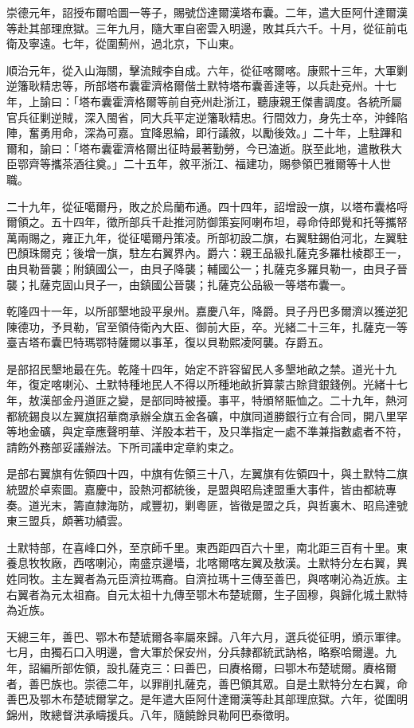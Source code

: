 \begin{pinyinscope}
崇德元年，詔授布爾哈圖一等子，賜號岱達爾漢塔布囊。二年，遣大臣阿什達爾漢等赴其部理庶獄。三年九月，隨大軍自密雲入明邊，敗其兵六千。十月，從征前屯衛及寧遠。七年，從圍薊州，過北京，下山東。

順治元年，從入山海關，擊流賊李自成。六年，從征喀爾喀。康熙十三年，大軍剿逆籓耿精忠等，所部塔布囊霍濟格爾偕土默特塔布囊善達等，以兵赴兗州。十七年，上諭曰：「塔布囊霍濟格爾等前自兗州赴浙江，聽康親王傑書調度。各統所屬官兵征剿逆賊，深入閩省，同大兵平定逆籓耿精忠。行間效力，身先士卒，沖鋒陷陣，奮勇用命，深為可嘉。宜降恩綸，即行議敘，以勵後效。」二十年，上駐蹕和爾和，諭曰：「塔布囊霍濟格爾出征時最著勤勞，今已溘逝。朕至此地，遣散秩大臣鄂齊等攜茶酒往奠。」二十五年，敘平浙江、福建功，賜參領巴雅爾等十人世職。

二十九年，從征噶爾丹，敗之於烏蘭布通。四十四年，詔增設一旗，以塔布囊格哷爾領之。五十四年，徵所部兵千赴推河防御策妄阿喇布坦，尋命侍郎覺和托等攜帑萬兩賜之，雍正九年，從征噶爾丹策凌。所部初設二旗，右翼駐錫伯河北，左翼駐巴顏珠爾克；後增一旗，駐左右翼界內。爵六：親王品級扎薩克多羅杜棱郡王一，由貝勒晉襲；附鎮國公一，由貝子降襲；輔國公一；扎薩克多羅貝勒一，由貝子晉襲；扎薩克固山貝子一，由鎮國公晉襲；扎薩克公品級一等塔布囊一。

乾隆四十一年，以所部墾地設平泉州。嘉慶八年，降爵。貝子丹巴多爾濟以獲逆犯陳德功，予貝勒，官至領侍衛內大臣、御前大臣，卒。光緒二十三年，扎薩克一等臺吉塔布囊巴特瑪鄂特薩爾以事革，復以貝勒熙凌阿襲。存爵五。

是部招民墾地最在先。乾隆十四年，始定不許容留民人多墾地畝之禁。道光十九年，復定喀喇沁、土默特種地民人不得以所種地畝折算蒙古賒貸銀錢例。光緒十七年，敖漢部金丹道匪之變，是部同時被擾。事平，特頒帑賑恤之。二十九年，熱河都統錫良以左翼旗招華商承辦全旗五金各礦，中旗同道勝銀行立有合同，開八里罕等地金礦，與定章應聲明華、洋股本若干，及只準指定一處不準兼指數處者不符，請飭外務部妥議辦法。下所司議申定章約束之。

是部右翼旗有佐領四十四，中旗有佐領三十八，左翼旗有佐領四十，與土默特二旗統盟於卓索圖。嘉慶中，設熱河都統後，是盟與昭烏達盟重大事件，皆由都統專奏。道光末，籌直隸海防，咸豐初，剿粵匪，皆徵是盟之兵，與哲裏木、昭烏達號東三盟兵，頗著功績雲。

土默特部，在喜峰口外，至京師千里。東西距四百六十里，南北距三百有十里。東養息牧牧廠，西喀喇沁，南盛京邊墻，北喀爾喀左翼及敖漢。土默特分左右翼，異姓同牧。主左翼者為元臣濟拉瑪裔。自濟拉瑪十三傳至善巴，與喀喇沁為近族。主右翼者為元太祖裔。自元太祖十九傳至鄂木布楚琥爾，生子固穆，與歸化城土默特為近族。

天總三年，善巴、鄂木布楚琥爾各率屬來歸。八年六月，選兵從征明，頒示軍律。七月，由獨石口入明邊，會大軍於保安州，分兵隸都統武訥格，略察哈爾邊。九年，詔編所部佐領，設扎薩克三：曰善巴，曰賡格爾，曰鄂木布楚琥爾。賡格爾者，善巴族也。崇德二年，以罪削扎薩克，善巴領其眾。自是土默特分左右翼，命善巴及鄂木布楚琥爾掌之。是年遣大臣阿什達爾漢等赴其部理庶獄。六年，從圍明錦州，敗總督洪承疇援兵。八年，隨饒餘貝勒阿巴泰徵明。


\end{pinyinscope}
